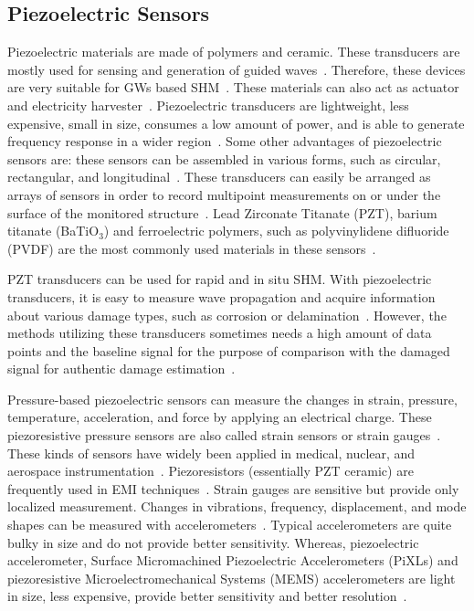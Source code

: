 \documentclass[b5paper, 11pt, titlepage]{book}
\begin{document}
\subsection{Piezoelectric Sensors}
Piezoelectric materials are made of polymers and ceramic. These transducers are mostly used for sensing and generation of guided waves~\cite{dimitriadis1991piezoelectric, Schulz1999, Badcock2000, thomas2017structural}. Therefore, these devices are very suitable for GWs based SHM~\cite{stepinski2013advanced}. These materials can also act as actuator and electricity harvester~\cite{Anton2007}. Piezoelectric transducers are lightweight, less expensive, small in size, consumes a low amount of power, and is able to generate frequency response in a wider region~\cite{stepinski2013advanced, su2009identification}. Some other advantages of piezoelectric sensors are: these sensors can be assembled in various forms, such as circular, rectangular, and longitudinal~\cite{stepinski2013advanced, TibaduizaBurgos2020}. These transducers can easily be arranged as arrays of sensors in order to record multipoint measurements on or under the surface of the monitored structure~\cite{Stavroulakis2013}. 
Lead Zirconate Titanate (PZT), barium titanate (BaTiO$_3$) and ferroelectric polymers, such as polyvinylidene difluoride (PVDF) are the most commonly used materials in these sensors~\cite{kkedziora2013piezoelectric}.

PZT transducers can be used for rapid and in situ SHM. With piezoelectric transducers, it is easy to measure wave propagation and acquire information about various damage types, such as corrosion or delamination~\cite{TibaduizaBurgos2020,Mitra2016}. However, the methods utilizing these transducers sometimes needs a high amount of data points and the baseline signal for the purpose of comparison with the damaged signal for authentic damage estimation~\cite{Farrar2012,Hameed2019}.

Pressure-based piezoelectric sensors can measure the changes in strain, pressure, temperature, acceleration, and force by applying an electrical charge. These piezoresistive pressure sensors are also called strain sensors or strain gauges~\cite{Das2018, Sikarwar2017}. These kinds of sensors have widely  been applied in medical, nuclear, and aerospace instrumentation~\cite{Sikarwar2017}. Piezoresistors (essentially PZT ceramic) are frequently used in EMI techniques~\cite{TibaduizaBurgos2020, jawaid2018structural}. Strain gauges are sensitive but provide only localized measurement. Changes in vibrations, frequency, displacement, and mode shapes can be measured with accelerometers~\cite{Salawu1997}. Typical accelerometers are quite bulky in size and do not provide better sensitivity. Whereas, piezoelectric accelerometer,  Surface Micromachined Piezoelectric Accelerometers (PiXLs) and piezoresistive Microelectromechanical Systems (MEMS) accelerometers are light in size, less expensive, provide  better sensitivity and better resolution~\cite{Das2018, Nemirovsky1996, DeVoe2001, Sabato2017}.    
\end{document}
